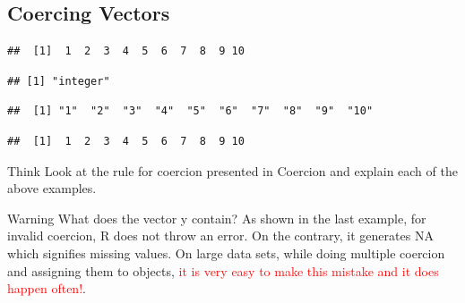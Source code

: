\documentclass[12pt]{book}\usepackage{knitr}
\begin{document}
\subsection{Coercing Vectors}
\begin{knitrout}
\color{fgcolor}\begin{kframe}
\begin{alltt}
\hlkwb{<-}\hlopt{:} 
\end{alltt}
\begin{verbatim}
##  [1]  1  2  3  4  5  6  7  8  9 10
\end{verbatim}
\begin{alltt}
 
\end{alltt}
\begin{verbatim}
## [1] "integer"
\end{verbatim}
\begin{alltt}
 
\end{alltt}
\begin{verbatim}
##  [1] "1"  "2"  "3"  "4"  "5"  "6"  "7"  "8"  "9"  "10"
\end{verbatim}
\begin{alltt}
\hlstd{(} 
\end{alltt}
\begin{verbatim}
##  [1]  1  2  3  4  5  6  7  8  9 10
\end{verbatim}
\begin{alltt}
\hlkwb{<-}\hlstd{(} 
\end{alltt}
\end{kframe}
\end{knitrout}
\begin{DIY}{Think}
Look at the rule for coercion presented in {Coercion} and explain each of the above examples.
\end{DIY}

\begin{DIY}{Warning}
What does the vector y contain? As shown in the last example, for invalid coercion, R does not throw an error. On the contrary, it generates NA which signifies missing values. On large data sets, while doing multiple coercion and assigning them to objects, \textcolor{red}{it is very easy to make this mistake and it does happen often!}.
\end{DIY}
\end{document}
